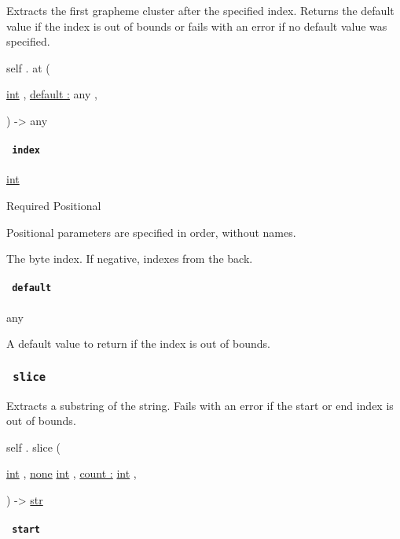 Extracts the first grapheme cluster after the specified index. Returns
the default value if the index is out of bounds or fails with an error
if no default value was specified.

self { . } { at } (

{ \href{/docs/reference/foundations/int/}{int} , } {
\hyperref[definitions-at-parameters-default]{default :} { any } , }

) -\textgreater{} { any }

\paragraph{\texorpdfstring{\texttt{\ index\ }}{ index }}\label{definitions-at-index}

\href{/docs/reference/foundations/int/}{int}

{Required} {{ Positional }}

\label{definitions-at-index-positional-tooltip}
Positional parameters are specified in order, without names.

The byte index. If negative, indexes from the back.

\paragraph{\texorpdfstring{\texttt{\ default\ }}{ default }}\label{definitions-at-default}

{ any }

A default value to return if the index is out of bounds.

\subsubsection{\texorpdfstring{\texttt{\ slice\ }}{ slice }}\label{definitions-slice}

Extracts a substring of the string. Fails with an error if the start or
end index is out of bounds.

self { . } { slice } (

{ \href{/docs/reference/foundations/int/}{int} , } {
\href{/docs/reference/foundations/none/}{none}
\href{/docs/reference/foundations/int/}{int} , } {
\hyperref[definitions-slice-parameters-count]{count :}
\href{/docs/reference/foundations/int/}{int} , }

) -\textgreater{} \href{/docs/reference/foundations/str/}{str}

\paragraph{\texorpdfstring{\texttt{\ start\ }}{ start }}\label{definitions-slice-start}

